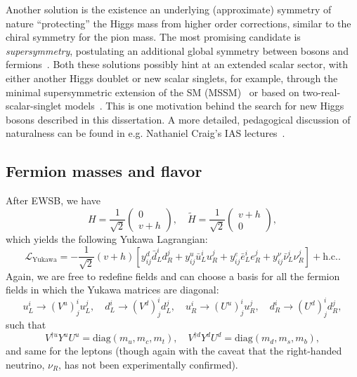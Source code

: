 Another solution is the existence an underlying (approximate) symmetry of nature ``protecting'' the Higgs mass from higher order corrections, similar to the chiral symmetry for the pion mass.
The most promising candidate is \textit{supersymmetry}, postulating an additional global symmetry between bosons and fermions~\cite{Wess:1992cp}.
Both these solutions possibly hint at an extended scalar sector, with either another Higgs doublet or new scalar singlets, for example, through the minimal supersymmetric extension of the SM (MSSM)~\cite{Craig:2013hca} or based on two-real-scalar-singlet models~\cite{Robens:2019kga}.
This is one motivation behind the search for new Higgs bosons described in this dissertation.
A more detailed, pedagogical discussion of naturalness can be found in e.g. Nathaniel Craig's IAS lectures~\cite{Craig:2017Lecture}.


\subsection{Fermion masses and flavor}
\label{sec:01_sm_ew_flavor}

After EWSB, we have
\begin{equation}
	\label{eq:01_sm_ew_higgs_tilde}
	H = \frac{1}{\sqrt{2}} \begin{pmatrix} 0 \\ v + h \end{pmatrix}, \quad
	\tilde H = \frac{1}{\sqrt{2}} \begin{pmatrix} v + h \\ 0 \end{pmatrix},
\end{equation}
which yields the following Yukawa Lagrangian:
\begin{equation}
	\label{eq:01_sm_ew_yukawa_after}
		\mathcal{L}_\mathrm{Yukawa} = -\frac{1}{\sqrt{2}}(v + h) \left[y^d_{ij} \bar d^i_L d^j_R + y^u_{ij} \bar u^i_L u^j_R + y^e_{ij} \bar e^i_L e^j_R + y^\nu_{ij} \bar \nu^i_L \nu^j_R\right] + \text{h.c.}.
\end{equation}
Again, we are free to redefine fields and can choose a basis for all the fermion fields in which the Yukawa matrices are diagonal:
\begin{equation}
	\label{eq:01_sm_ew_yukawa_transformation}
	u^i_L \rightarrow (V^u)^i_j u^j_L, \quad d^i_L \rightarrow (V^d)^i_j d^j_L, \quad u^i_R \rightarrow (U^u)^i_j u^j_R, \quad d^i_R \rightarrow (U^d)^i_j d^j_R,
\end{equation}
such that
\begin{equation}
	\label{eq:01_sm_ew_yukawa_diagonal}
	V^{\dagger u} Y^u U^u = \mathrm{diag}(m_u, m_c, m_t), \quad V^{\dagger d} Y^d U^d = \text{diag}(m_d, m_s, m_b),
\end{equation}
and same for the leptons (though again with the caveat that the right-handed neutrino, $\nu_R$, has not been experimentally confirmed).

